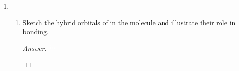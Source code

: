 \documentclass[../psets.tex]{subfiles}
\begin{document}
\begin{enumerate}
\begin{enumerate}
\begin{proof}[Answer]
        \end{proof}
        \item If the incident radiation has a wavelength of $\SI{57.8}{\nano\meter}$, what is the largest electron binding energy that can be measured?
        \begin{proof}
            Using the above equation again, if $\lambda=\SI{5.78e-8}{\meter}$, the largest electron binding energy that can be measured is that which gives a $KE$ detectably greater than zero. Numerically,
            \begin{align*}
                0 &< KE\\
                0 &< h\nu-W\\
                W &< \frac{hc}{\lambda}\\
                &= \SI{3.44e-18}{\joule}
            \end{align*}
            i.e., the largest energy that can be measured is bounded by .
        \end{proof}
    \end{enumerate}
    \item 
    \begin{enumerate}
        \item Sketch the hybrid orbitals of  in the molecule  and illustrate their role in bonding.
        \begin{proof}[Answer]
            ${\color{white}hi}$
            \begin{center}
\end{center}
\end{proof}
\end{enumerate}
\end{enumerate}
\end{document}
